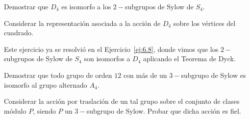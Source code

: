 \begin{ejercicio}\label{ej:6.22}
    Demostrar que $D_4$ es isomorfo a los $2-$subgrupos de Sylow de $S_4$.
    \begin{observacion}
        Considerar la representación asociada a la acción de $D_4$ sobre los vértices del cuadrado.
    \end{observacion}
    
    
    Este ejercicio ya se resolvió en el Ejercicio~\ref{ej:6.8}, donde vimos que los $2-$subgrupos de Sylow de $S_4$ son isomorfos a $D_4$ aplicando el Teorema de Dyck.
\end{ejercicio}

\begin{ejercicio}\label{ej:6.23}
    Demostrar que todo grupo de orden $12$ con más de un $3-$subgrupo de Sylow es isomorfo al grupo alternado $A_4$.
    \begin{observacion}
        Considerar la acción por traslación de un tal grupo sobre el conjunto de clases módulo $P$, siendo $P$ un $3-$subgrupo de Sylow. Probar que dicha acción es fiel.
    \end{observacion}

\end{ejercicio}

